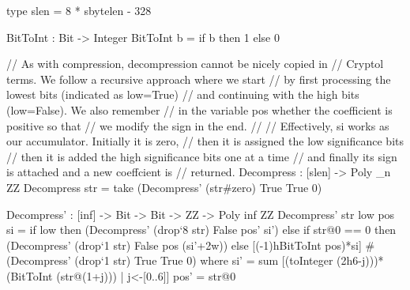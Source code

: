 \begin{code}
  type slen = 8 * sbytelen - 328
\end{code}

\begin{algorithm}[!htp]
\caption{$\decompress(\str, \slen)$ \hfill}\label{alg:decompress}
	\begin{algorithmic}[1]
	\If{$|\str| \neq \slen$}\label{line:fix} 
	\Return{$\bot$} \label{line:fix2}
	\EndIf
	\label{line:dbin} 
	\label{line:8}
	\EndWhile
	\label{line:zero} 
	\Return{$\bot$}\label{line:zero2}
	\EndIf
	\EndFor
	\label{line:trail} 
	\Return{$\bot$}\label{line:trail2}
	\EndIf
	\end{algorithmic}
\end{algorithm}

\begin{code}
  BitToInt : Bit -> Integer
  BitToInt b = if b then 1 else 0

  // As with compression, decompression cannot be nicely copied in
  // Cryptol terms. We follow a recursive approach where we start
  // by first processing the lowest bits (indicated as low=True)
  // and continuing with the high bits (low=False). We also remember
  // in the variable pos whether the coefficient is positive so that
  // we modify the sign in the end.
  //
  // Effectively, si works as our accumulator. Initially it is zero,
  // then it is assigned the low significance bits
  // then it is added the high significance bits one at a time
  // and finally its sign is attached and a new coeffcient is
  // returned.
  Decompress : [slen] -> Poly _n ZZ
  Decompress str = take (Decompress' (str#zero) True True 0)

  Decompress' : [inf] -> Bit -> Bit -> ZZ -> Poly inf ZZ
  Decompress' str low pos si =
    if low
    then (Decompress' (drop`{8} str) False pos' si')
    else
      if str@0 == 0
      then (Decompress' (drop`{1} str) False pos (si'+2^^7))
      else [(-1)^^(BitToInt pos)*si]
           # (Decompress' (drop`{1} str) True True 0)
    where
      si' = sum [(toInteger (2^^(6-j)))*(BitToInt (str@(1+j))) | j<-[0..6]]
      pos' = str@0
\end{code}

